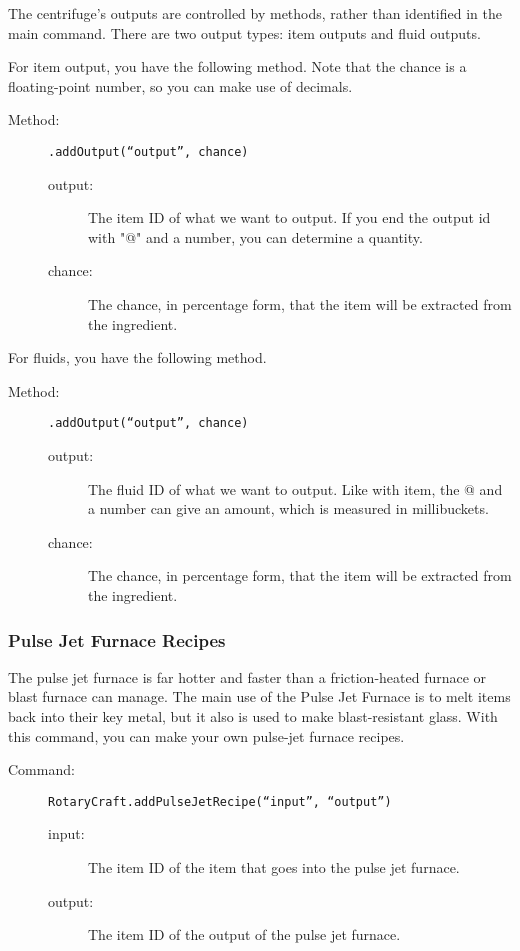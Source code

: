 \documentclass[letterpaper,titlepage,12pt]{article}
\begin{document}
The centrifuge's outputs are controlled by methods, rather than identified in the main command.  There are two output types: item outputs and fluid outputs.

For item output, you have the following method.  Note that the chance is a floating-point number, so you can make use of decimals.

\begin{description}
\item[Method:] \texttt{.addOutput(``output'', chance)}
\begin{description}
\item [output:] The item ID of what we want to output.  If you end the output id with "@" and a number, you can determine a quantity.
\item [chance:] The chance, in percentage form, that the item will be extracted from the ingredient.
\end{description}
\end{description}

For fluids, you have the following method.  

\begin{description}
\item[Method:] \texttt{.addOutput(``output'', chance)}
\begin{description}
\item [output:] The fluid ID of what we want to output.  Like with item, the @ and a number can give an amount, which is measured in millibuckets.
\item [chance:] The chance, in percentage form, that the item will be extracted from the ingredient.
\end{description}
\end{description}

\subsubsection{Pulse Jet Furnace Recipes} 

The pulse jet furnace is far hotter and faster than a friction-heated furnace or blast furnace can manage.  The main use of the Pulse Jet Furnace is to melt items back into their key metal, but it also is used to make blast-resistant glass.  With this command, you can make your own pulse-jet furnace recipes.

\begin{description}
\item[Command:] \texttt{RotaryCraft.addPulseJetRecipe(``input'', ``output'')}
\begin{description}
\item [input:] The item ID of the item that goes into the pulse jet furnace.
\item [output:] The item ID of the output of the pulse jet furnace.
\end{description}
\end{description}
\end{document}
